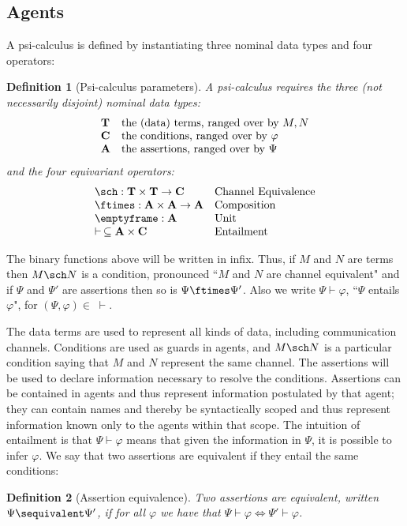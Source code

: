 \documentclass{eptcs}
\newtheorem{definition}{Definition}
\theoremstyle{definition}
\begin{document}
\subsection{Agents}

\newcommand{\terms}{{\rm\bf T}}
\newcommand{\conditions}{{\rm\bf C}}
\newcommand{\assertions}{{\rm\bf A}}


A psi-calculus is defined by instantiating three nominal data types and four operators:
\begin{definition}[Psi-calculus parameters]
\label{def:parameters}
A psi-calculus requires the three (not necessarily disjoint) nominal data types:
\[\begin{array}{ll}
\terms & \mbox{the (data) terms, ranged over by $M,N$} \\
\conditions  & \mbox{the conditions, ranged over by $\varphi$}\\
\assertions & \mbox{the assertions, ranged over by $\Psi$}
\end{array}\]
and the four equivariant operators:
\[\begin{array}{ll}
\sch:  \terms \times \terms \to \conditions & \mbox{Channel Equivalence} \\
\ftimes: \assertions \times \assertions \to \assertions& \mbox{Composition} \\
\emptyframe: \assertions& \mbox{Unit} \\
\vdash\,\subseteq \assertions \times \conditions & \mbox{Entailment}
\end{array}
\]
\end{definition}
The binary functions above will be written in infix. Thus, if $M$ and $N$ are terms then $M \sch N$ is a condition, pronounced ``$M$ and $N$ are channel equivalent" and if $\Psi$ and $\Psi'$ are assertions then so is $\Psi \ftimes \Psi'$. Also we write $\Psi \vdash \varphi$, ``$\Psi$ entails $\varphi$", for $(\Psi, \varphi) \in \;\vdash$.


The data terms are used to represent all kinds of data, including communication
channels. Conditions are used as guards in agents, and $M \sch N$ is a
particular condition saying that $M$ and $N$ represent the
same channel.
The assertions will be used to declare information necessary to resolve the
conditions. Assertions can be contained in agents and thus represent information
postulated by that agent; they can contain names and thereby be syntactically
scoped and thus represent information known only to the agents within that
scope. 
The intuition of entailment is that $\Psi \vdash \varphi$ means that given the
information in $\Psi$, it is possible to infer $\varphi$.
 We say that two assertions are equivalent if they entail the same conditions:
\begin{definition}[Assertion equivalence]
\label{def:assEq}
Two assertions are {\em equivalent}, written $\Psi \sequivalent \Psi'$, if for all $\varphi$ we have that $\Psi \vdash \varphi \Leftrightarrow\Psi' \vdash \varphi$.
\end{definition}
\end{document}
